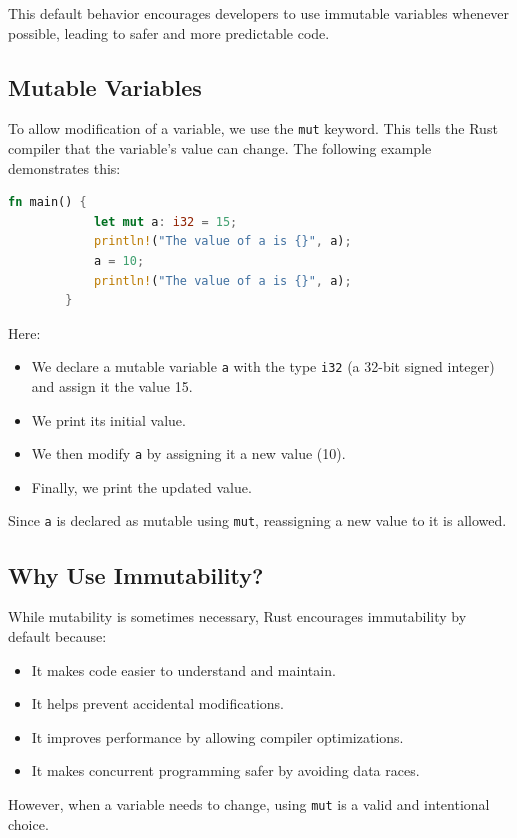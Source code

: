 \documentclass[a4paper,12pt]{report}
\begin{document}
		\noindent This default behavior encourages developers to use immutable variables whenever possible, leading to safer and more predictable code.
	
	\subsection*{Mutable Variables}
	To allow modification of a variable, we use the \texttt{mut} keyword. This tells the Rust compiler that the variable’s value can change. The following example demonstrates this:
	
	\begin{lstlisting}[language=Rust]
		fn main() {
			let mut a: i32 = 15;
			println!("The value of a is {}", a);
			a = 10;
			println!("The value of a is {}", a);
		}
	\end{lstlisting}
	
	\noindent Here:
	\begin{itemize}
		\item We declare a mutable variable \texttt{a} with the type \texttt{i32} (a 32-bit signed integer) and assign it the value 15.
		\item We print its initial value.
		\item We then modify \texttt{a} by assigning it a new value (10).
		\item Finally, we print the updated value.
	\end{itemize}
	
	Since \texttt{a} is declared as mutable using \texttt{mut}, reassigning a new value to it is allowed.
	
	\subsection*{Why Use Immutability?}
	While mutability is sometimes necessary, Rust encourages immutability by default because:
	\begin{itemize}
		\item It makes code easier to understand and maintain.
		\item It helps prevent accidental modifications.
		\item It improves performance by allowing compiler optimizations.
		\item It makes concurrent programming safer by avoiding data races.
	\end{itemize}
	
		\noindent However, when a variable needs to change, using \texttt{mut} is a valid and intentional choice.
	
\end{document}
